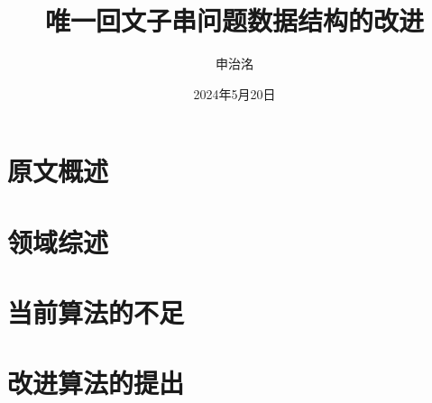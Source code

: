 \documentclass{ctexart}
\title{唯一回文子串问题数据结构的改进}
\author{申治洺}
\date{2024年5月20日}
\begin{document}
    \maketitle

    \section{原文概述}\label{sec:1}
    

    \section{领域综述}\label{sec:2}
    

    \section{当前算法的不足}\label{sec:3}
    

    \section{改进算法的提出}\label{sec:4}
    

    
    
\end{document}
